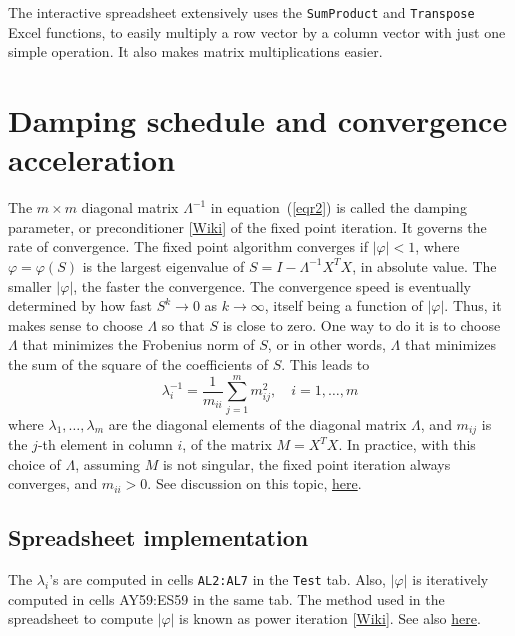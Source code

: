 \documentclass[oneside,10pt]{book}
\begin{document}
The interactive spreadsheet extensively uses the \texttt{SumProduct} and \texttt{Transpose} Excel functions, to easily multiply a row vector by a column vector with just one simple operation. It also makes matrix multiplications easier.

\section{Damping schedule and convergence acceleration}

The $m\times m$ diagonal matrix $\Lambda^{-1}$ in equation~(\ref{eqr2}) is called the damping parameter, or \textcolor{index}{preconditioner}
[\href{https://en.wikipedia.org/wiki/Preconditioner}{Wiki}] of the fixed point iteration. It governs the rate of convergence.
The fixed point algorithm converges if $|\varphi|<1$, where $\varphi=\varphi(S)$ is the largest eigenvalue of $S=I-\Lambda^{-1} X^T X$, in absolute value.
The smaller $|\varphi|$, the faster the convergence. The convergence speed is eventually determined by how fast $S^k\rightarrow 0$ as $k\rightarrow\infty$, itself being a function of $|\varphi|$. Thus, it makes sense to choose $\Lambda$ so that $S$ is close to zero. One way to do it is to choose $\Lambda$ that minimizes the Frobenius norm of $S$, or in other words, $\Lambda$ that minimizes the sum of the square of the coefficients of $S$. This leads to
\begin{equation}
\lambda_i^{-1}=\frac{1}{m_{ii}}\sum_{j=1}^m m_{ij}^2, \quad i=1,\dots,m \label{zizi}
\end{equation}
where $\lambda_1,\dots,\lambda_m$ are the diagonal elements of the diagonal matrix $\Lambda$, and $m_{ij}$ is the $j$-th element in column $i$, of the matrix $M=X^T X$. In practice, with this choice of $\Lambda$, assuming $M$ is not singular, the fixed point iteration always converges, and $m_{ii}>0$. See discussion on this topic, \href{https://mathoverflow.net/questions/421309/power-of-a-matrix-largest-eigenvalue-in-absolute-value-and-convergence-acceler}{here}.

\subsection{Spreadsheet implementation}\label{rbbb2}

The $\lambda_i$'s are computed in cells \texttt{AL2:AL7} in the \texttt{Test} tab. Also, $|\varphi|$ is iteratively computed in cells AY59:ES59 in the same tab. The method used in the spreadsheet to compute $|\varphi|$ is known as \textcolor{index}{power iteration} [\href{https://en.wikipedia.org/wiki/Power_iteration}{Wiki}].
See also \href{https://math.stackexchange.com/questions/2554808/finding-approximation-of-largest-eigenvalue}{here}.
\end{document}
